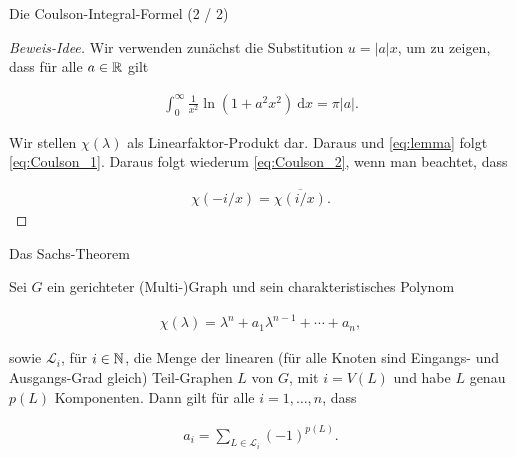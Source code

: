 \documentclass[aspectratio = 169]{beamer}
\begin{document}
\begin{frame}{Die Coulson-Integral-Formel (2 / 2)}
    
    \begin{proof}[Beweis-Idee]

        Wir verwenden zunächst die Substitution $u = |a| x$, um zu zeigen, dass für alle $a \in \mathbb R$ gilt

        \begin{align} \label{eq:lemma}
            \int_0^\infty
                \frac{1}{x^2}
                \ln(1 + a^2 x^2)
                ~ \mathrm d x
            =
            \pi |a|.
        \end{align}

        Wir stellen $\chi(\lambda)$ als Linearfaktor-Produkt dar.
        Daraus und \eqref{eq:lemma} folgt \eqref{eq:Coulson_1}.
        Daraus folgt wiederum \eqref{eq:Coulson_2}, wenn man beachtet, dass

        \begin{align*}
            \chi(-i/x) = \overline{\chi(i/x)}.
        \end{align*}


    \end{proof}

\end{frame}


\begin{frame}{Das Sachs-Theorem}
    
    \begin{theorem}

        Sei $G$ ein gerichteter (Multi-)Graph und sein charakteristisches Polynom

        \begin{align*}
            \chi(\lambda)
            =
            \lambda^n + a_1 \lambda^{n-1} + \cdots + a_n,
        \end{align*}

        sowie $\mathcal L_i$, für $i \in \mathbb N$, die Menge der linearen (für alle Knoten sind Eingangs- und Ausgangs-Grad gleich) Teil-Graphen $L$ von $G$, mit $i = V(L)$ und habe $L$ genau $p(L)$ Komponenten.
        Dann gilt für alle $i = 1, \dots, n$, dass

        \begin{align*}
            a_i = \sum_{L \in \mathcal L_i} (-1)^{p(L)}.
        \end{align*}

    \end{theorem}

\end{frame}
\end{document}
